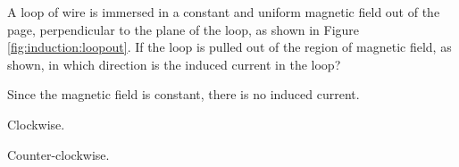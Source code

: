 \begin{checkpoint}{}\label{induction:checkpoint:movingloop}
	\begin{MCquestion}{A loop of wire is immersed in a constant and uniform magnetic field out of the page, perpendicular to the plane of the loop, as shown in Figure \ref{fig:induction:loopout}. If the loop is pulled out of the region of magnetic field, as shown, in which direction is the induced current in the loop?
	}
		\item Since the magnetic field is constant, there is no induced current.
		\item Clockwise. 
		\item Counter-clockwise.\correct 
	\end{MCquestion}
\end{checkpoint}

